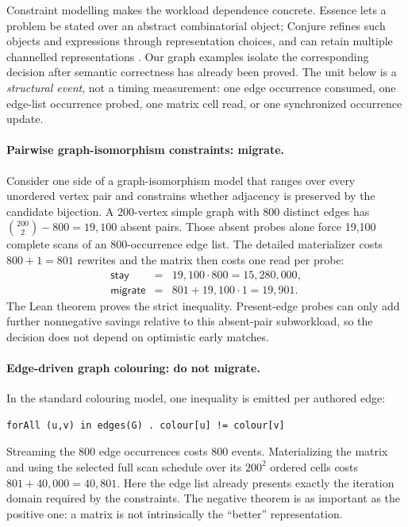 \documentclass[11pt]{article}
\theoremstyle{remark}
\begin{document}
Constraint modelling makes the workload dependence concrete.  Essence lets a
problem be stated over an abstract combinatorial object; Conjure refines such
objects and expressions through representation choices, and can retain
multiple channelled representations \cite{essence,conjure}.  Our graph
examples isolate the corresponding decision after semantic correctness has
already been proved.  The unit below is a \emph{structural event}, not a timing
measurement: one edge occurrence consumed, one edge-list occurrence probed,
one matrix cell read, or one synchronized occurrence update.

\paragraph{Pairwise graph-isomorphism constraints: migrate.}
Consider one side of a graph-isomorphism model that ranges over every
unordered vertex pair and constrains whether adjacency is preserved by the
candidate bijection.  A 200-vertex simple graph with 800 distinct edges has
\(\binom{200}{2}-800=19{,}100\) absent pairs.  Those absent probes alone force
19,100 complete scans of an 800-occurrence edge list.  The detailed
materializer costs \(800+1=801\) rewrites and the matrix then costs one read per
probe:
\[
\begin{array}{rcl}
\mathsf{stay} &=& 19{,}100\cdot800=15{,}280{,}000,\\
\mathsf{migrate} &=& 801+19{,}100\cdot1=19{,}901.
\end{array}
\]
The Lean theorem proves the strict inequality.  Present-edge probes can only
add further nonnegative savings relative to this absent-pair subworkload, so
the decision does not depend on optimistic early matches.

\paragraph{Edge-driven graph colouring: do not migrate.}
In the standard colouring model, one inequality is emitted per authored edge:
\begin{lstlisting}[style=graphlang,language={}]
forAll (u,v) in edges(G) . colour[u] != colour[v]
\end{lstlisting}
Streaming the 800 edge occurrences costs 800 events.  Materializing the
matrix and using the selected full scan schedule over its \(200^2\) ordered
cells costs
\(801+40{,}000=40{,}801\).  Here the edge list already presents exactly the
iteration domain required by the constraints.  The negative theorem is as
important as the positive one: a matrix is not intrinsically the ``better''
representation.
\end{document}
